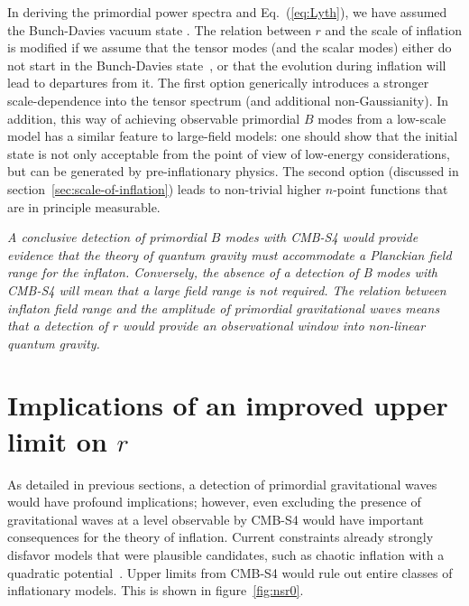 In deriving the primordial power spectra and Eq.~(\ref{eq:Lyth}), we have assumed the Bunch-Davies vacuum state \cite{Bunch:1978yq}. The relation between $r$ and the scale of inflation is modified if we assume that the tensor  modes (and the scalar modes) either do not start in the Bunch-Davies state~\cite{Ashoorioon:2014nta,Collins:2014yua}, or that the evolution during inflation will lead to departures from it. The first option generically introduces a stronger scale-dependence into the tensor spectrum \cite{Aravind:2014axa,Flauger:2013hra} (and additional non-Gaussianity). In addition, this way of achieving observable primordial $B$ modes from a low-scale model has a similar feature to large-field models: one should show that the initial state is not only acceptable from the point of view of low-energy considerations, but can be generated by pre-inflationary physics. The second option (discussed in section~\ref{sec:scale-of-inflation}) leads to non-trivial higher $n$-point functions that are in principle measurable.

{\it A conclusive detection of primordial $B$ modes with CMB-S4 would provide evidence that the theory of quantum gravity must accommodate a Planckian field range for the inflaton. Conversely, the absence of a detection of B modes with CMB-S4 will mean that a large field range is not required. The relation between inflaton field range and the amplitude of primordial gravitational waves means that a detection of $r$ would provide an observational window into non-linear quantum gravity.}


\section{Implications of an improved upper limit on $r$} 
\label{sec:upperLimits}
As detailed in previous sections, a detection of primordial gravitational waves would have profound implications; however, even excluding the presence of gravitational waves at a level observable by CMB-S4 would have important consequences for the theory of inflation. Current constraints already strongly disfavor models that were plausible candidates, such as chaotic inflation with a quadratic potential~\cite{Ade:2015lrj,Ade:2015tva,Array:2015xqh}. Upper limits from CMB-S4 would rule out entire classes of inflationary models. This is shown in figure~\ref{fig:nsr0}. 

